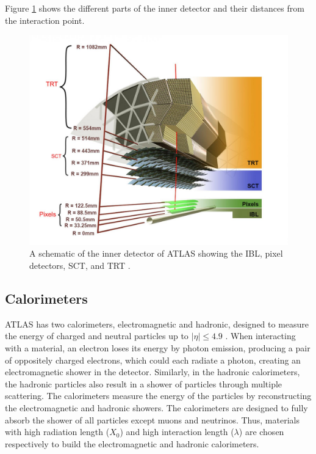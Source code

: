 Figure \ref{fig:ATLAS_ID} shows the different parts of the inner detector and their distances from the interaction point.

\begin{figure}[!htbp]
    \centering
    \includegraphics[width=.98\linewidth]{figures/LHC/ATLAS_InnerDetector.jpg}
    \caption{ A schematic of the inner detector of ATLAS showing the IBL, pixel detectors, SCT, and TRT \cite{ID_Align_Run2}.\label{fig:ATLAS_ID}}
\end{figure}

\subsection{Calorimeters}
\label{subsec:Cal}

ATLAS has two calorimeters, electromagnetic and hadronic, designed to measure the energy of charged and neutral particles up to $|\eta|\leq4.9$ \cite{ATLAS}. When interacting with a material, an electron loses its energy by photon emission, producing a pair of oppositely charged electrons, which could each radiate a photon, creating an electromagnetic shower in the detector. Similarly, in the hadronic calorimeters, the hadronic particles also result in a shower of particles through multiple scattering. The calorimeters measure the energy of the particles by reconstructing the electromagnetic and hadronic showers. The calorimeters are designed to fully absorb the shower of all particles except muons and neutrinos. Thus, materials with high radiation length ($X_{0}$) and high interaction length ($\lambda$) are chosen respectively to build the electromagnetic and hadronic calorimeters.

